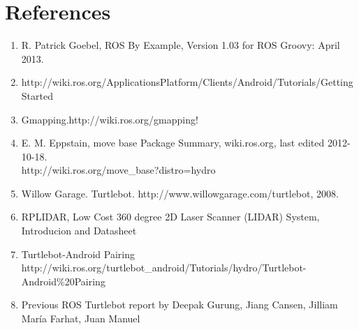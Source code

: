 \documentclass[10pt,a4paper]{article}
\begin{document}
\section{References}

\begin{enumerate}

\item R. Patrick Goebel, ROS By Example, Version 1.03 for ROS Groovy: April 2013.

\item http://wiki.ros.org/ApplicationsPlatform/Clients/Android/Tutorials/Getting Started

\item Gmapping.http://wiki.ros.org/gmapping!

\item E. M. Eppstain, move base Package Summary, wiki.ros.org, last edited 2012-10-18.\\
http://wiki.ros.org/move\_base?distro=hydro

\item Willow Garage. Turtlebot. http://www.willowgarage.com/turtlebot, 2008.

\item RPLIDAR, Low Cost 360 degree 2D Laser Scanner (LIDAR) System, Introducion and Datasheet

\item Turtlebot-Android Pairing http://wiki.ros.org/turtlebot\_android/Tutorials/hydro/Turtlebot-Android\%20Pairing

\item Previous ROS Turtlebot report by Deepak Gurung, Jiang Cansen, Jilliam María 
Farhat, Juan Manuel
\end{enumerate}
\end{document}
